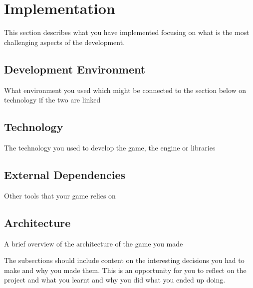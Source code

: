 \section{Implementation}
\label{sec:implementation}

This section describes what you have implemented focusing on what is the most challenging aspects of the development.

\subsection{Development Environment}

What environment you used which might be connected to the section below on technology if the two are linked

\subsection{Technology}

The technology you used to develop the game, the engine or libraries


\subsection{External Dependencies}
Other tools that your game relies on

\subsection{Architecture}
A brief overview of the architecture of the game you made





The subsections should include content on the interesting decisions you had to make and why you made them.  This is an opportunity for you to reflect on the project and what you learnt and why you did what you ended up doing.


\subsection{}
